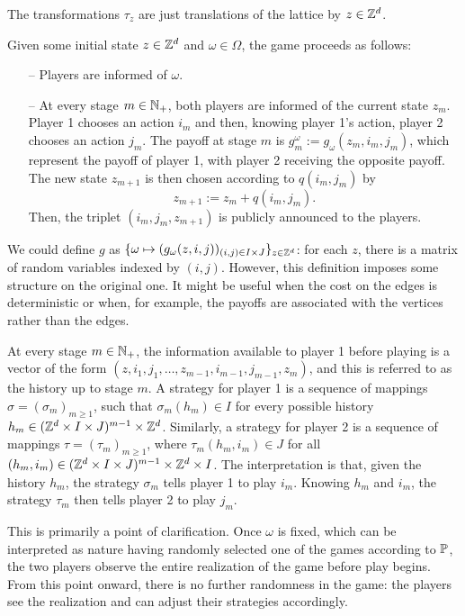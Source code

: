 	The transformations $\tau_z$ are just translations of the lattice by $z \in \mathbb{Z}^d$.
	
	Given some initial state $z \in \mathbb{Z}^d$ and $\omega \in \Omega$, the game proceeds as follows:
	\begin{itemize}
		\item[--] Players are informed of $\omega$.
		\item[--] At every stage $m \in \mathbb{N}_+$, both players are informed of the current state $z_{m}$. Player 1 chooses an action $i_m$ and then, knowing player 1's action, player 2 chooses an action $j_m$. The payoff at stage $m$ is $g_m^{\omega} := g_{\omega}(z_{m}, i_m, j_m)$, which represent the payoff of player 1, with player 2 receiving the opposite payoff. The new state $z_{m + 1}$ is then chosen according to $q(i_m, j_m)$ by  
		\[
			z_{m+1} := z_m + q(i_m, j_m).
		\]
		Then, the triplet $(i_m, j_m, z_{m+1})$ is publicly announced to the players.
	\end{itemize}

	\begin{remark}
		We could define $g$ as $\{\omega \mapsto (g_{\omega}(z,i,j))_{(i, j) \in I \times J}\}_{z \in \mathbb{Z}^d}$: for each $z$, there is a matrix of random variables indexed by $(i, j)$. However, this definition imposes some structure on the original one. It might be useful when the cost on the edges is deterministic or when, for example, the payoffs are associated with the vertices rather than the edges.
	\end{remark}

	At every stage $m \in \mathbb{N}_+$, the information available to player 1 before playing is a vector of the form $(z, i_1, j_1, \ldots, z_{m-1}, i_{m-1}, j_{m-1}, z_m)$, and this is referred to as the history up to stage $m$. A strategy for player 1 is a sequence of mappings $\sigma = (\sigma_m)_{m\geq 1}$, such that $\sigma_m(h_{m}) \in I$ for every possible history $h_{m} \in (\mathbb{Z}^{d}\times I \times J)^{m-1} \times \mathbb{Z}^d$. Similarly, a strategy for player 2 is a sequence of mappings $\tau = (\tau_m)_{m \geq 1}$, where $\tau_m(h_m, i_m) \in J$ for all $(h_m, i_m) \in (\mathbb{Z}^{d}\times I \times J)^{m-1} \times \mathbb{Z}^d \times I$. The interpretation is that, given the history $h_m$, the strategy $\sigma_m$ tells player 1 to play $i_m$. Knowing $h_m$ and $i_m$, the strategy $\tau_m$ then tells player 2 to play $j_m$.

	\begin{remark}
		This is primarily a point of clarification. Once $\omega$ is fixed, which can be interpreted as nature having randomly selected one of the games according to $\mathbb{P}$, the two players observe the entire realization of the game before play begins. From this point onward, there is no further randomness in the game: the players see the realization and can adjust their strategies accordingly.
	\end{remark}

